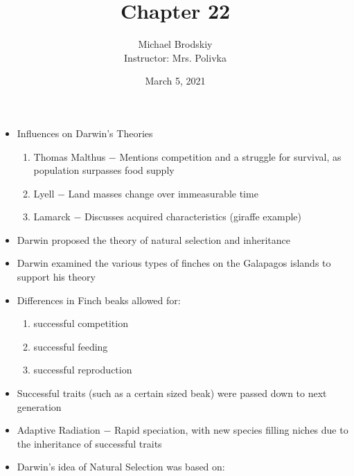 \documentclass[12pt]{article}
\title{Chapter 22}
\date{March 5, 2021}
\author{Michael Brodskiy\\ \small Instructor: Mrs. Polivka}
\begin{document}
\maketitle

\begin{itemize}

  \item Influences on Darwin's Theories

    \begin{enumerate}

      \item Thomas Malthus $-$ Mentions competition and a struggle for survival, as population surpasses food supply

      \item Lyell $-$ Land masses change over immeasurable time

      \item Lamarck $-$ Discusses acquired characteristics (giraffe example)

    \end{enumerate}

  \item Darwin proposed the theory of natural selection and inheritance

  \item Darwin examined the various types of finches on the Galapagos islands to support his theory

  \item Differences in Finch beaks allowed for:

    \begin{enumerate}

      \item successful competition

      \item successful feeding

      \item successful reproduction

    \end{enumerate}

  \item Successful traits (such as a certain sized beak) were passed down to next generation

  \item Adaptive Radiation $-$ Rapid speciation, with new species filling niches due to the inheritance of successful traits

  \item Darwin's idea of Natural Selection was based on:


\end{itemize}
\end{document}
